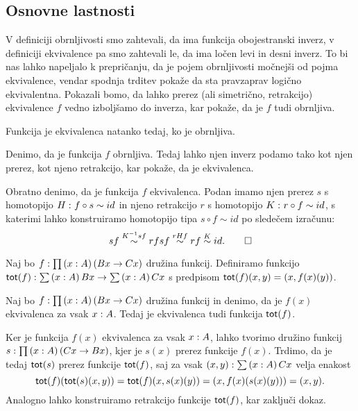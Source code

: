 \subsection{Osnovne lastnosti}

V definiciji obrnljivosti smo zahtevali, da ima funkcija obojestranski inverz, v
definiciji ekvivalence pa smo zahtevali le, da ima ločen levi in desni inverz.
To bi nas lahko
napeljalo k prepričanju, da je pojem obrnljivosti močnejši od pojma ekvivalence, vendar
spodnja trditev pokaže da sta pravzaprav logično ekvivalentna. Pokazali bomo, da lahko
prerez (ali simetrično, retrakcijo) ekvivalence \(f\) vedno izboljšamo do inverza,
kar pokaže, da je \(f\) tudi obrnljiva.

\begin{trditev}
  \label{inv-of-equiv}
  Funkcija je ekvivalenca natanko tedaj, ko je obrnljiva.
\end{trditev}

\begin{dokaz}
  Denimo, da je funkcija \(f\) obrnljiva. Tedaj lahko njen inverz podamo tako kot njen
  prerez, kot njeno retrakcijo, kar pokaže, da je ekvivalenca.

  Obratno denimo, da je funkcija \(f\) ekvivalenca. Podan imamo njen prerez \(s\) s
  homotopijo \(H \,\colon f \circ s \sim id\) in njeno retrakcijo \(r\) s homotopijo
  \(K \,\colon r \circ f \sim id\), s katerimi lahko konstruiramo homotopijo tipa
  \(s \circ f \sim id\) po sledečem izračunu:
  \[s f \overset{K^{-1}sf}{\sim} r f s f \overset{rHf}{\sim} r f \overset{K}{\sim} id. \qedhere\]
\end{dokaz}

\begin{definicija}
  Naj bo \(f : \prod \left( x : A \right) \left(Bx \to Cx\right)\) družina funkcij.
  Definiramo funkcijo
  \(\textnormal{\textsf{tot}}(f) : \sum \left( x : A \right) Bx \to \sum \left( x : A \right) Cx\) s predpisom
  \(\textnormal{\textsf{tot}}(f)(x, y) = (x, f(x)(y))\).
\end{definicija}

\begin{trditev}
  Naj bo \(f : \prod \left( x : A \right) \left(Bx \to Cx\right)\) družina funkcij
  in denimo, da je \(f(x)\) ekvivalenca za vsak \(x : A\). Tedaj je
  ekvivalenca tudi funkcija \(\textnormal{\textsf{tot}}(f)\).
\end{trditev}

\begin{dokaz}
  Ker je funkcija \(f(x)\) ekvivalenca za vsak \(x : A\),
  lahko tvorimo družino funkcij
  \(s : \prod \left( x : A \right) \left(Cx \to Bx\right)\), kjer je \(s(x)\)
  prerez funkcije \(f(x)\).
  Trdimo, da je tedaj \(\textnormal{\textsf{tot}}(s)\) prerez funkcije \(\textnormal{\textsf{tot}}(f)\), saj
  za vsak \((x, y) : \sum \left( x : A \right) Cx\) velja enakost
  \[\textnormal{\textsf{tot}}(f)(\textnormal{\textsf{tot}}(s)(x, y)) = \textnormal{\textsf{tot}}(f)(x, s(x)(y)) = (x, f(x)(s(x)(y))) = (x, y).\]
  Analogno lahko konstruiramo retrakcijo funkcije \(\textnormal{\textsf{tot}}(f)\), kar zaključi dokaz.
\end{dokaz}

